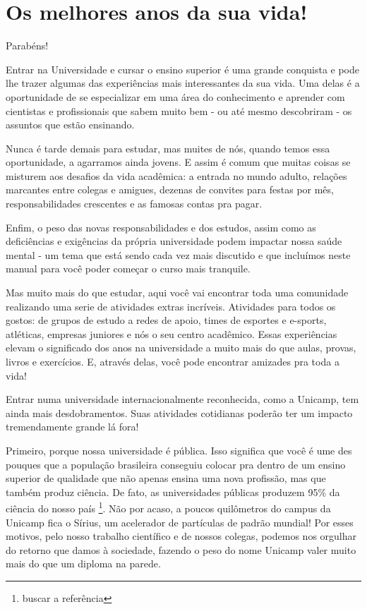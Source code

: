 \section{Os melhores anos da sua vida!}

Parabéns!

Entrar na Universidade e cursar o ensino superior é uma grande conquista e pode lhe trazer algumas das experiências mais interessantes da sua vida. Uma delas é a oportunidade de se especializar em uma área do conhecimento e aprender com cientistas e profissionais que sabem muito bem - ou até mesmo descobriram - os assuntos que estão ensinando.

Nunca é tarde demais para estudar, mas muites de nós, quando temos essa oportunidade, a agarramos ainda jovens. E assim é comum que muitas coisas se misturem aos desafios da vida acadêmica: a entrada no mundo adulto, relações marcantes entre colegas e amigues, dezenas de convites para festas por mês, responsabilidades crescentes e as famosas contas pra pagar.

Enfim, o peso das novas responsabilidades e dos estudos, assim como as deficiências e exigências da própria universidade podem impactar nossa saúde mental - um tema que está sendo cada vez mais discutido e que incluímos neste manual para você poder começar o curso mais tranquile.

Mas muito mais do que estudar, aqui você vai encontrar toda uma comunidade realizando uma serie de atividades extras incríveis. Atividades para todos os gostos: de grupos de estudo a redes de apoio, times de esportes e e-sports, atléticas, empresas juniores e nós o seu centro acadêmico. Essas experiências elevam o significado dos anos na universidade a muito mais do que aulas, provas, livros e exercícios. E, através delas, você pode encontrar amizades pra toda a vida!

Entrar numa universidade internacionalmente reconhecida, como a Unicamp, tem ainda mais desdobramentos. Suas atividades cotidianas poderão ter um impacto tremendamente grande lá fora!

Primeiro, porque nossa universidade é pública. Isso significa que você é ume des pouques que a população brasileira conseguiu colocar pra dentro de um ensino superior de qualidade que não apenas ensina uma nova profissão, mas que também produz ciência. De fato, as universidades públicas produzem 95\% da ciência do nosso país \footnote{buscar a referência}. Não por acaso, a poucos quilômetros do campus da Unicamp fica o Sírius, um acelerador de partículas de padrão mundial! Por esses motivos, pelo nosso trabalho científico e de nossos colegas, podemos nos orgulhar do retorno que damos à sociedade, fazendo o peso do nome Unicamp valer muito mais do que um diploma na parede.

